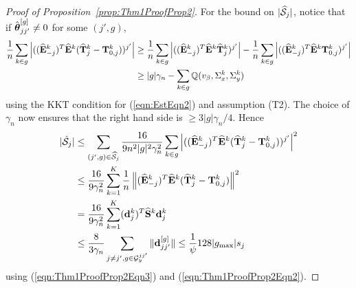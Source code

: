 \documentclass[12pt, letterpaper]{article}
\numberwithin{equation}{section}
\begin{document}
\begin{proof}[Proof of Proposition~\ref{prop:Thm1ProofProp2}]
For the bound on $| \widehat {{\cal{S}}}_j|$, notice that if $\hat {{\boldsymbol{\theta}}}_{jj'}^{[g]} \neq 0$ for some $(j',g)$,
%
\begin{align*}
\frac{1}{n} \sum_{k \in g} \left| ((\widehat {{\mathbf{E}}}_{-j}^k)^T \widehat {{\mathbf{E}}}^k ( \widehat {{\mathbf{T}}}_j^k - {\mathbf{T}}_{0,j}^k ))^{j'} \right| & \geq
\frac{1}{n} \sum_{k \in g} \left| ((\widehat {{\mathbf{E}}}_{-j}^k)^T \widehat {{\mathbf{E}}}^k \widehat {{\mathbf{T}}}_j^k )^{j'} \right| - \frac{1}{n} \sum_{k \in g} \left| ((\widehat {{\mathbf{E}}}_{-j}^k)^T \widehat {{\mathbf{E}}}^k {\mathbf{T}}_{0,j}^k )^{j'} \right|\\
& \geq |g| \gamma_n - \sum_{k \in g} {\mathbb{Q}} ( v_\beta, \Sigma_x^k, \Sigma_y^k )
\end{align*}
%
using the KKT condition for (\ref{eqn:EstEqn2}) and assumption (T2). The choice of $\gamma_n$ now ensures that the right hand side is $\geq 3|g| \gamma_n / 4$. Hence
%
\begin{align*}
| \hat {{\cal{S}}}_j| & \leq \sum_{(j',g) \in \widehat {{\cal{S}}}_j} \frac{16}{9 n^2 |g|^2 \gamma_n^2 } \sum_{k \in g} \left| ((\widehat {{\mathbf{E}}}_{-j}^k)^T \widehat {{\mathbf{E}}}^k ( \widehat {{\mathbf{T}}}_j^k - {\mathbf{T}}_{0,j}^k ))^{j'} \right|^2\\
& \leq \frac{16}{9 \gamma_n^2} \sum_{k=1}^K \frac{1}{n} \left\| (\widehat {{\mathbf{E}}}_{-j}^k)^T \widehat {{\mathbf{E}}}^k ( \widehat {{\mathbf{T}}}_j^k - {\mathbf{T}}_{0,j}^k ) \right\|^2 \\
& = \frac{16}{9 \gamma_n^2} \sum_{k=1}^K ({\bf{d}}_j^k)^T \widehat {{\mathbf{S}}}^k {\bf{d}}_j^k \\
& \leq \frac{8}{3 \gamma_n} \sum_{j \neq j', g \in {\cal{G}}_y^{jj'}} \| {\bf{d}}_{jj'}^{[g]} \| \leq \frac{1}{\psi} 128 | g_{\max}| s_j 
\end{align*}
%
using (\ref{eqn:Thm1ProofProp2Eqn3}) and (\ref{eqn:Thm1ProofProp2Eqn2}).
\end{proof}
\end{document}

